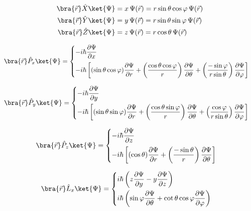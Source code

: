 \begin{align}
    \bra{\vec{r}} \hat{X} \ket{\Psi} &= x\,\Psi(\vec{r}) = r\sin\theta\cos\varphi\,\Psi(\vec{r}) \notag\\
    \bra{\vec{r}} \hat{Y} \ket{\Psi} &= y\,\Psi(\vec{r}) = r\sin\theta\sin\varphi\,\Psi(\vec{r}) \notag\\
    \bra{\vec{r}} \hat{Z} \ket{\Psi} &= z\,\Psi(\vec{r}) = r\cos\theta\,\Psi(\vec{r})
\label{eq:aula20_XYZ_acao}
\end{align}

\begin{equation}
    \bra{\vec{r}} \hat{P}_x \ket{\Psi} =
    \begin{cases}
        -i\hbar \dfrac{\partial \Psi}{\partial x} \\[3mm]
        -i\hbar \left[ (\sin\theta\cos\varphi)\dfrac{\partial \Psi}{\partial r} + \left(\dfrac{\cos\theta\cos\varphi}{r}\right)\dfrac{\partial \Psi}{\partial \theta} + \left(\dfrac{-\sin\varphi}{r\sin\theta}\right)\dfrac{\partial \Psi}{\partial \varphi} \right]
    \end{cases}
\label{eq:aula20_Px_acao}
\end{equation}

\begin{equation}
    \bra{\vec{r}} \hat{P}_y \ket{\Psi} =
    \begin{cases}
        -i\hbar \dfrac{\partial \Psi}{\partial y} \\[3mm]
        -i\hbar \left[ (\sin\theta\sin\varphi)\dfrac{\partial \Psi}{\partial r} + \left(\dfrac{\cos\theta\sin\varphi}{r}\right)\dfrac{\partial \Psi}{\partial \theta} + \left(\dfrac{\cos\varphi}{r\sin\theta}\right)\dfrac{\partial \Psi}{\partial \varphi} \right]
    \end{cases}
\label{eq:aula20_Py_acao}
\end{equation}

\begin{equation}
    \bra{\vec{r}} \hat{P}_z \ket{\Psi} =
    \begin{cases}
        -i\hbar \dfrac{\partial \Psi}{\partial z} \\[3mm]
        -i\hbar \left[ (\cos\theta)\dfrac{\partial \Psi}{\partial r} + \left(\dfrac{-\sin\theta}{r}\right)\dfrac{\partial \Psi}{\partial \theta} \right]
    \end{cases}
\label{eq:aula20_Pz_acao}
\end{equation}

\begin{equation}
    \bra{\vec{r}} \hat{L}_x \ket{\Psi} =
    \begin{cases}
        i\hbar \left( z \dfrac{\partial \Psi}{\partial y} - y \dfrac{\partial \Psi}{\partial z} \right) \\[3mm]
        i\hbar \left( \sin\varphi \dfrac{\partial \Psi}{\partial \theta} + \cot\theta\cos\varphi \dfrac{\partial \Psi}{\partial \varphi} \right)
    \end{cases}
\label{eq:aula20_Lx_acao}
\end{equation}

